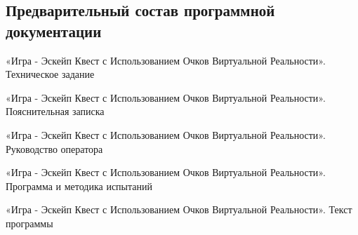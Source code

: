 \subsection{Предварительный состав программной документации}
\begin{my_enumerate}
    \item «Игра - Эскейп Квест с Использованием Очков Виртуальной Реальности». Техническое задание
    \item «Игра - Эскейп Квест с Использованием Очков Виртуальной Реальности». Пояснительная записка
    \item «Игра - Эскейп Квест с Использованием Очков Виртуальной Реальности». Руководство оператора
    \item «Игра - Эскейп Квест с Использованием Очков Виртуальной Реальности». Программа и методика испытаний
    \item «Игра - Эскейп Квест с Использованием Очков Виртуальной Реальности».  Текст программы
\end{my_enumerate}

